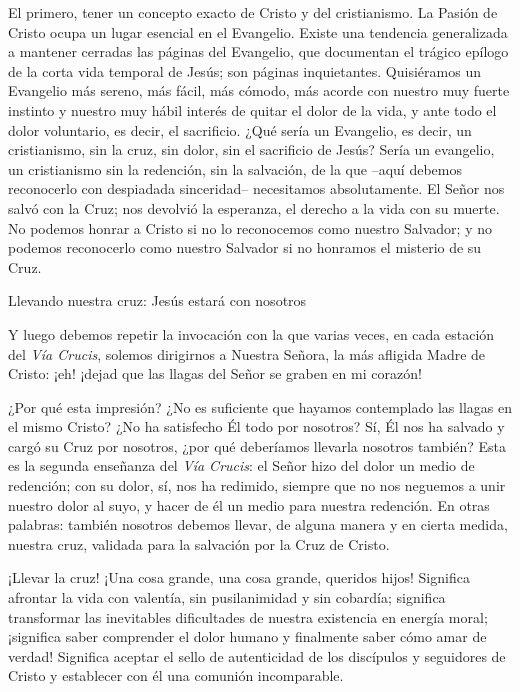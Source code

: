 			\begin{body}El primero, tener un concepto exacto de Cristo y del cristianismo. La Pasión de Cristo ocupa un lugar esencial en el Evangelio. Existe una tendencia generalizada a mantener cerradas las páginas del Evangelio, que documentan el trágico epílogo de la corta vida temporal de Jesús; son páginas inquietantes. Quisiéramos un Evangelio más sereno, más fácil, más cómodo, más acorde con nuestro muy fuerte instinto y nuestro muy hábil interés de quitar el dolor de la vida, y ante todo el dolor voluntario, es decir, el sacrificio. ¿Qué sería un Evangelio, es decir, un cristianismo, sin la cruz, sin dolor, sin el sacrificio de Jesús? Sería un evangelio, un cristianismo sin la redención, sin la salvación, de la que –aquí debemos reconocerlo con despiadada sinceridad– necesitamos absolutamente. El Señor nos salvó con la Cruz; nos devolvió la esperanza, el derecho a la vida con su muerte. No podemos honrar a Cristo si no lo reconocemos como nuestro Salvador; y no podemos reconocerlo como nuestro Salvador si no honramos el misterio de su Cruz. \end{body}
			
			\begin{centerbold}Llevando nuestra cruz: Jesús estará con nosotros \end{centerbold}
			
			\begin{body}Y luego debemos repetir la invocación con la que varias veces, en cada estación del \textit{Vía Crucis}, solemos dirigirnos a Nuestra Señora, la más afligida Madre de Cristo: ¡eh! ¡dejad que las llagas del Señor se graben en mi corazón! \end{body}
			
			\begin{body}¿Por qué esta impresión? ¿No es suficiente que hayamos contemplado las llagas en el mismo Cristo? ¿No ha satisfecho Él todo por nosotros? Sí, Él nos ha salvado y cargó su Cruz por nosotros, ¿por qué deberíamos llevarla nosotros también? Esta es la segunda enseñanza del \textit{Vía Crucis}: el Señor hizo del dolor un medio de redención; con su dolor, sí, nos ha redimido, siempre que no nos neguemos a unir nuestro dolor al suyo, y hacer de él un medio para nuestra redención. En otras palabras: también nosotros debemos llevar, de alguna manera y en cierta medida, nuestra cruz, validada para la salvación por la Cruz de Cristo. \end{body}
			
			\begin{body}¡Llevar la cruz! ¡Una cosa grande, una cosa grande, queridos hijos! Significa afrontar la vida con valentía, sin pusilanimidad y sin cobardía; significa transformar las inevitables dificultades de nuestra existencia en energía moral; ¡significa saber comprender el dolor humano y finalmente saber cómo amar de verdad! Significa aceptar el sello de autenticidad de los discípulos y seguidores de Cristo y establecer con él una comunión incomparable.\end{body}
			
